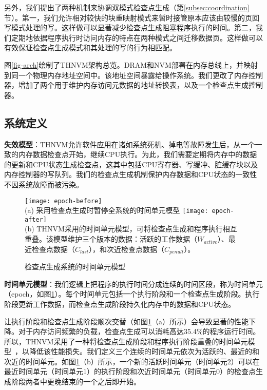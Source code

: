 另外，我们提出了两种机制来协调双模式检查点生成（第\ref{subsec:coordination}节）。第一，我们允许相对较快的块重映射模式来暂时接管原本应该由较慢的页回写模式处理的写。这样做可以显著减少检查点生成阻塞程序执行的时间。第二，我们定期地依据程序执行时访问内存的特点在两种模式之间迁移数据页。这样做可以有效保证检查点生成模式和其处理的写的行为相匹配。

图\ref{fig-arch}绘制了THNVM架构总览。DRAM和NVM部署在内存总线上，并映射到同一个物理内存地址空间中。该地址空间暴露给操作系统。我们更改了内存控制器，增加了两个用于维护内存访问元数据的地址转换表，以及一个检查点生成控制器。

\subsection{系统定义}

\textbf{失效模型}：THNVM允许软件应用在诸如系统死机、掉电等故障发生后，从一个一致的内存数据检查点开始，继续CPU执行。为此，我们需要定期将内存中的数据的更新和CPU状态生成检查点，这其中包括CPU寄存器、写缓冲、脏缓存块以及内存控制器的写队列。我们的检查点生成机制保护内存数据和CPU状态的一致性不因系统故障而被污染。

\begin{figure}[t]
\centering
\texttt{[image: epoch-before]}\\
{\small (a) 采用检查点生成时暂停全系统的时间单元模型}
\texttt{[image: epoch-after]}\\
{\small (b) THNVM采用的时间单元模型，可将检查点生成和程序执行相互重叠。该模型维护三个版本的数据：活跃的工作数据（$W_{active}$）、最近检查点数据（$C_{last}$），和次近检查点数据（$C_{penult}$）。\hfill}
\caption{检查点生成系统的时间单元模型}
\label{fig-epoch}
\end{figure}

\textbf{时间单元模型}：我们逻辑上把程序的执行时间分成连续的时间区段，称为时间单元（epoch，如图\ref{fig-epoch}）。每个时间单元包括一个执行阶段和一个检查点生成阶段。执行阶段更新工作数据，而检查点生成阶段持久化内存中的数据和CPU状态。

让执行阶段和检查点生成阶段顺次交替（如图\ref{fig-epoch}（a）所示）会导致显著的性能下降。对于内存访问频繁的负载，检查点生成可以消耗高达35.4\%的程序运行时间。所以，THNVM采用了一种将检查点生成阶段和程序执行阶段重叠的时间单元模型~\cite{1003568}，以降低该性能损失。我们定义三个连续的时间单元依次为活跃的、最近的和次近的时间单元。如图\ref{fig-epoch}（b）所示，一个新的活跃时间单元（时间单元2）可以在最近时间单元（时间单元1）的执行阶段和次近时间单元（时间单元0）的检查点生成阶段两者中更晚结束的一个之后即开始。

